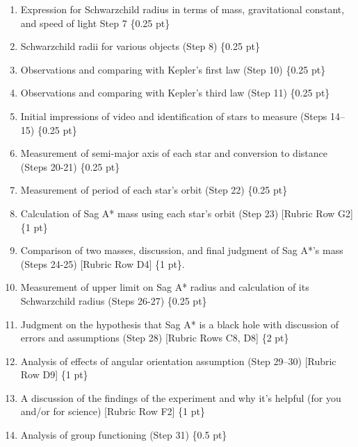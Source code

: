 \begin{enumerate}
	\item Expression for Schwarzchild radius in terms of mass, gravitational constant, and speed of light {Step 7} \{0.25 pt\}
	
	\item Schwarzchild radii for various objects (Step 8) \{0.25 pt\}
	
	\item Observations and comparing with Kepler's first law (Step 10) \{0.25 pt\}
	
	\item Observations and comparing with Kepler's third law (Step 11) \{0.25 pt\}
	
	\item Initial impressions of video and identification of stars to measure (Steps 14--15) \{0.25 pt\}
	
	\item Measurement of semi-major axis of each star and conversion to distance (Steps 20-21) \{0.25 pt\}
	
	\item Measurement of period of each star's orbit (Step 22) \{0.25 pt\}
	
	\item Calculation of Sag A* mass using each star's orbit (Step 23) [Rubric Row G2] \{1 pt\}
	
	\item Comparison of two masses, discussion, and final judgment of Sag A*'s mass (Steps 24-25) [Rubric Row D4] \{1 pt\}.
	
	\item Measurement of upper limit on Sag A* radius and calculation of its Schwarzchild radius (Steps 26-27) \{0.25 pt\}
	
	\item Judgment on the hypothesis that Sag A* is a black hole with discussion of errors and assumptions (Step 28) [Rubric Rows C8, D8] \{2 pt\}
	
	\item Analysis of effects of angular orientation assumption (Step 29--30) [Rubric Row D9] \{1 pt\}
	
	\item A discussion of the findings of the experiment and why it's helpful (for you and/or for science) [Rubric Row F2] \{1 pt\}
	
	\item Analysis of group functioning (Step 31) \{0.5 pt\}
\end{enumerate}

